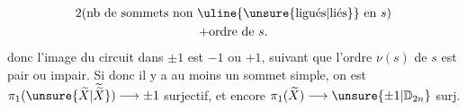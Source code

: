 {%
\[
\begin{gathered}
2(\text{nb de sommets non}\ \uline{\text{\unsure{ligués|liés}}}\ \text{en }s)\\
+\text{ordre de }s.
\end{gathered}
\]
 donc l'image du circuit dans $\pm1$ est $-1$ ou $+1$, suivant que l'ordre  $\nu(s)$ de $s$ est pair ou impair.
Si donc il y a au moins un sommet simple, on est  $\pi_1(\unsure{\widetilde X|\widetilde{\widetilde X}})\longrightarrow\pm1$ surjectif, et encore $\pi_1(\widetilde X)\longrightarrow\unsure{\pm1|\mathbb D_{2n}}$ surj.
}
